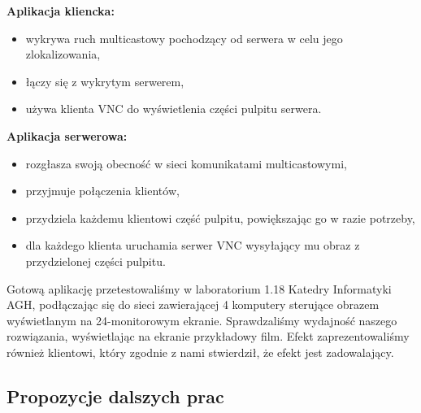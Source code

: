     \textbf{Aplikacja kliencka:}
    \begin{itemize}[noitemsep,nolistsep]
      \item wykrywa ruch multicastowy pochodzący od serwera w celu jego zlokalizowania,
      \item łączy się z wykrytym serwerem,
      \item używa klienta VNC do wyświetlenia części pulpitu serwera.
    \end{itemize}

    \vspace{3mm}

    \textbf{Aplikacja serwerowa:}
    \begin{itemize}[noitemsep,nolistsep]
      \item rozgłasza swoją obecność w sieci komunikatami multicastowymi,
      \item przyjmuje połączenia klientów,
      \item przydziela każdemu klientowi część pulpitu, powiększając go w razie potrzeby,
      \item dla każdego klienta uruchamia serwer VNC wysyłający mu obraz z przydzielonej części pulpitu.
    \end{itemize}

    \vspace{3mm}

    Gotową aplikację przetestowaliśmy w laboratorium 1.18 Katedry Informatyki AGH, podłączając się do sieci zawierającej 4 komputery sterujące obrazem wyświetlanym na 24-monitorowym ekranie. Sprawdzaliśmy wydajność naszego rozwiązania, wyświetlając na ekranie przykładowy film. Efekt zaprezentowaliśmy również klientowi, który zgodnie z nami stwierdził, że efekt jest zadowalający.

  \subsection{Propozycje dalszych prac}

